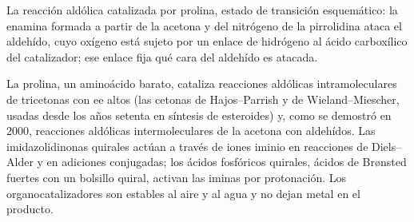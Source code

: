 \begin{omfigure}

{\small La reacción aldólica catalizada por prolina, estado de transición esquemático: la
enamina formada a partir de la acetona y del nitrógeno de la pirrolidina ataca el aldehído,
cuyo oxígeno está sujeto por un enlace de hidrógeno al ácido carboxílico del catalizador;
ese enlace fija qué cara del aldehído es atacada.}
\end{omfigure}

La prolina, un aminoácido barato, cataliza reacciones aldólicas intramoleculares de
tricetonas con ee altos (las cetonas de Hajos--Parrish y de Wieland--Miescher, usadas
desde los años setenta en síntesis de esteroides) y, como se demostró en 2000, reacciones
aldólicas intermoleculares de la acetona con aldehídos. Las imidazolidinonas quirales actúan a través de
iones iminio en reacciones de Diels--Alder y en adiciones conjugadas; los
ácidos fosfóricos quirales, ácidos de Brønsted fuertes con un bolsillo quiral, activan las iminas
por protonación. Los organocatalizadores son estables al aire y al agua y no dejan metal
en el producto.

